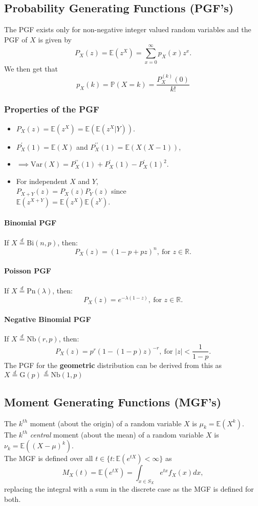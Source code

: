 \documentclass[titlepage,twocolumn]{article}
\begin{document}
\subsection*{Probability Generating Functions (PGF's)}
The PGF exists only for non-negative integer valued random variables and the PGF of $X$ is given by $$P_X(z) = \mathbb{E}(z^X) = \sum_{x=0}^{\infty}p_X(x)z^x.$$ We then get that $$p_X(k) = \mathbb{P}(X=k) = \frac{P_X^{(k)}(0)}{k!}$$
\subsubsection*{Properties of the PGF}
\begin{itemize}
    \item $P_X(z) = \mathbb{E}(z^X) = \mathbb{E}(\mathbb{E}(z^X|Y))$.
    \item $P_X^\prime(1) = \mathbb{E}(X)$ and $P_X^{\prime\prime}(1) = \mathbb{E}(X(X-1))$,
    \item $\implies \mbox{Var}(X) = P_X^{\prime\prime}(1) + P_X^{\prime}(1) - P_X^{\prime}(1)^2$.
    \item For independent $X$ and $Y$,\\$P_{X+Y}(z)=P_X(z)P_Y(z)$ since\\$\mathbb{E}(z^{X+Y}) = \mathbb{E}(z^X)\mathbb{E}(z^Y)$.
\end{itemize}
\paragraph{Binomial PGF}
If $X\stackrel{d}{=}\mbox{Bi}(n,p)$, then: $$P_X(z) = (1-p+pz)^n,\ \mbox{for } z \in \mathbb{R}.$$
\paragraph{Poisson PGF}
If $X\stackrel{d}{=}\mbox{Pn}(\lambda)$, then: $$P_X(z) = e^{-\lambda (1-z)},\ \mbox{for } z \in \mathbb{R}.$$
\paragraph{Negative Binomial PGF}
If $X\stackrel{d}{=}\mbox{Nb}(r,p)$, then: $$P_X(z) = p^r(1-(1-p)z)^{-r},\ \mbox{for } |z| < \frac{1}{1-p}.$$ The PGF for the \textbf{geometric} distribution can be derived from this as $X\stackrel{d}{=}\mbox{G}(p)\stackrel{d}{=}\mbox{Nb}(1,p)$

\subsection*{Moment Generating Functions (MGF's)}
The $k^{th}$ moment (about the origin) of a random variable $X$ is $\mu_k = \mathbb{E}(X^k)$.\\[2mm]
The $k^{th}$ \textit{central} moment (about the mean) of a random variable $X$ is $\nu_k = \mathbb{E}((X-\mu)^k)$.\\[2mm]
The MGF is defined over all $t \in \{t: \mathbb{E}(e^{tX}) < \infty\}$ as $$M_X(t) = \mathbb{E}(e^{tX}) = \int_{x \in S_X}e^{tx}f_X(x)dx,$$ replacing the integral with a sum in the discrete case as the MGF is defined for both.
\end{document}
